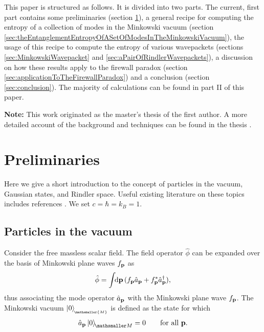 \documentclass[11pt, a4paper]{article}
\def\bp{{\bf p}}
\newcommand{\integral}{\int\!\! \mathrm{d}}
\newcommand{\ket}[1]{\left| #1 \right>} %
\newcommand{\ketmink}{\ket{0}_{\!\ms M}}
\newcommand{\ms}{\mathsmaller}
\newcommand{\mink}{{\,_{\!\!\ms{M}}}}
\begin{document}
This paper is structured as follows. It is divided into two parts. The current, first part contains some preliminaries (section \ref{sec:preliminaries}), a general recipe for computing the entropy of a collection of modes in the Minkowski vacuum (section \ref{sec:theEntanglementEntropyOfASetOfModesInTheMinkowskiVacuum}),
the usage of this recipe to compute the entropy of various wavepackets (sections \ref{sec:MinkowskiWavepacket} and \ref{sec:aPairOfRindlerWavepackets}), a discussion on how these results apply to the firewall paradox (section  \ref{sec:applicationToTheFirewallParadox}) and a conclusion (section \ref{sec:conclusion}). The majority of calculations can be found in part II of this paper. 

{\bf Note:} This work originated as the master's thesis of the first author. A more detailed account of the background and techniques can be found in the thesis \cite{Kattemolle}.
\section{Preliminaries}\label{sec:preliminaries}
Here we give a short introduction to the concept of particles in the vacuum, Gaussian states, and Rindler space. Useful existing literature on these topics includes references \cite{BirellDavies, Carroll, Ferraro, Adesso, Demarie, Wang, Takagi, Crispino, Susskind}. We set $c=\hbar=k_B=1$. 

\subsection{Particles in the vacuum}
\label{sec:particlesInTheVacuum}
Consider the free massless scalar field. The field operator $\hat \phi$ can be expanded over the basis of Minkowski plane waves $f_\bp$ as
\begin{align*}
	\hat \phi=\integral \bp\,(f_\bp \hat a_\bp+f_\bp^* \hat a_\bp^\dagger),
\end{align*}
thus associating the mode operator $\hat a_\bp$ with the Minkowski plane wave $f_\bp$. The Minkowski vacuum $\ket{0}_\mink$ is defined as the state for which
\begin{align}
\label{eq:MinkowskiVacuum}
\hat a_\bp\ketmink=0\qquad \text{for all }\bp.  
\end{align}
\end{document}
